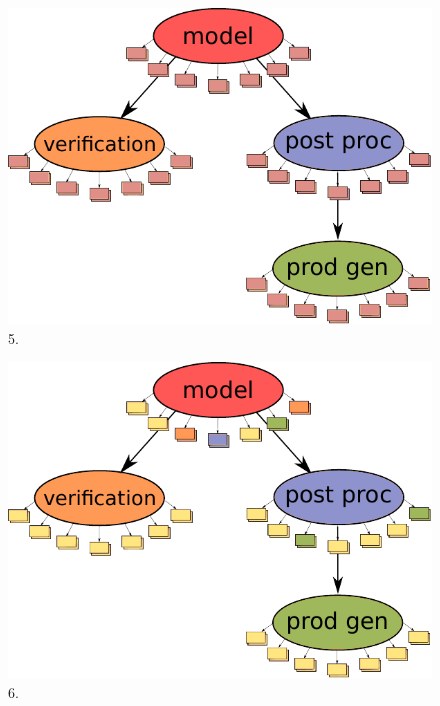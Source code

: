 \documentclass[a4paper]{article}
\begin{document}
\begin{figure}[H]
  \centering
  \includegraphics[width=0.6\columnwidth]{model5}
  \caption{5.}
  \label{fig:model5}
\end{figure}

\begin{figure}[H]
  \centering
  \includegraphics[width=0.6\columnwidth]{model6}
  \caption{6.}
  \label{fig:model6}
\end{figure}
\end{document}
